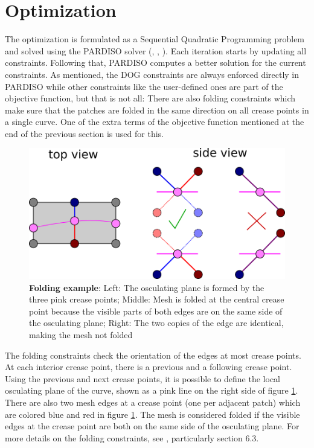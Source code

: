 \documentclass[a4paper,twoside,12pt,nochapterprefix]{scrbook}
\begin{document}
\section{Optimization}\label{sec:optimization}
The optimization is formulated as a Sequential Quadratic Programming problem and solved using the PARDISO solver (\cite{pardiso-6.0a}, \cite{pardiso-6.0b}, \cite{pardiso-6.0c}). Each iteration starts by updating all constraints. Following that, PARDISO computes a better solution for the current constraints. As mentioned, the DOG constraints are always enforced directly in PARDISO while other constraints like the user-defined ones are part of the objective function, but that is not all:\newline
There are also folding constraints which make sure that the patches are folded in the same direction on all crease points in a single curve. One of the extra terms of the objective function mentioned at the end of the previous section is used for this.\newline
\begin{figure}
    \centering
    \includegraphics[width=0.4\linewidth]{figures/0322_folding_constraints}
    \caption{\textbf{Folding example}: Left: The osculating plane is formed by the three pink crease points; Middle: Mesh is folded at the central crease point because the visible parts of both edges are on the same side of the osculating plane; Right: The two copies of the edge are identical, making the mesh not folded}
    \label{fig:folding_constraints}
\end{figure}
The folding constraints check the orientation of the edges at most crease points. At each interior crease point, there is a previous and a following crease point. Using the previous and next crease points, it is possible to define the local osculating plane of the curve, shown as a pink line on the right side of figure \ref{fig:folding_constraints}. There are also two mesh edges at a crease point (one per adjacent patch) which are colored blue and red in figure \ref{fig:folding_constraints}. The mesh is considered folded if the visible edges at the crease point are both on the same side of the osculating plane. For more details on the folding constraints, see \cite{Rabinovich:CurvedFolds:2019}, particularly section 6.3.\newline
\end{document}
